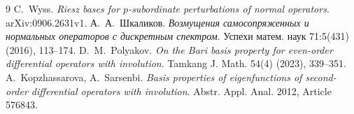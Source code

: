 \documentclass[12pt,a4paper]{article}
\theoremstyle{definition}
\begin{document}
\begin{thebibliography}{9}
C.~Wyss. \emph{Riesz bases for $p$-subordinate perturbations of normal operators}.
arXiv:0906.2631v1.
А.~А.~Шкаликов. \emph{Возмущения самосопряженных и нормальных операторов с дискретным
спектром}. Успехи матем. наук 71:5(431) (2016), 113--174.
D.~M.~Polyakov. \emph{On the Bari basis property for even-order differential operators
with involution}. Tamkang J. Math. 54(4) (2023), 339--351.
A.~Kopzhassarova, A.~Sarsenbi. \emph{Basis properties of eigenfunctions of second-order
differential operators with involution}. Abstr. Appl. Anal. 2012, Article 576843.
\end{thebibliography}
\end{document}
